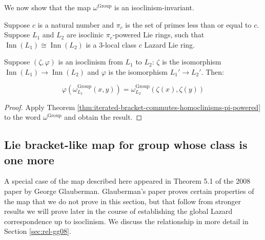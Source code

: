 We now show that the map $\omega^{\text{Group}}$ is an isoclinism-invariant.

\begin{lemma}\label{lemma:omega-group-isoclinism-invariant}
  Suppose $c$ is a natural number and $\pi_c$ is the set of primes less
  than or equal to $c$. Suppose $L_1$ and $L_2$ are isoclinic
  $\pi_c$-powered Lie rings, such that $\operatorname{Inn}(L_1) \cong
  \operatorname{Inn}(L_2)$ is a $3$-local class $c$ Lazard Lie ring.

  Suppose $(\zeta,\varphi)$ is an isoclinism from $L_1$ to $L_2$:
  $\zeta$ is the isomorphism $\operatorname{Inn}(L_1) \to
  \operatorname{Inn}(L_2)$ and $\varphi$ is the isomorphism $L_1' \to
  L_2'$. Then:

  $$\varphi(\omega^{\text{Group}}_{L_1}(x,y)) = \omega^{\text{Group}}_{L_2}(\zeta(x),\zeta(y))$$
\end{lemma}

\begin{proof}
  Apply Theorem
  \ref{thm:iterated-bracket-commutes-homoclinisms-pi-powered} to the
  word $\omega^{\text{Group}}$ and obtain the result.
\end{proof}


\subsection{Lie bracket-like map for group whose class is one more}\label{sec:lie-bracket-like-map}

A special case of the map described here appeared in Theorem 5.1 of
the 2008 paper \cite{GG08} by George Glauberman. Glauberman's paper
proves certain properties of the map that we do not prove in this
section, but that follow from stronger results we will prove later in
the course of establishing the global Lazard correspondence up to
isoclinism. We discuss the relationship in more detail in Section
\ref{sec:rel-gg08}.

